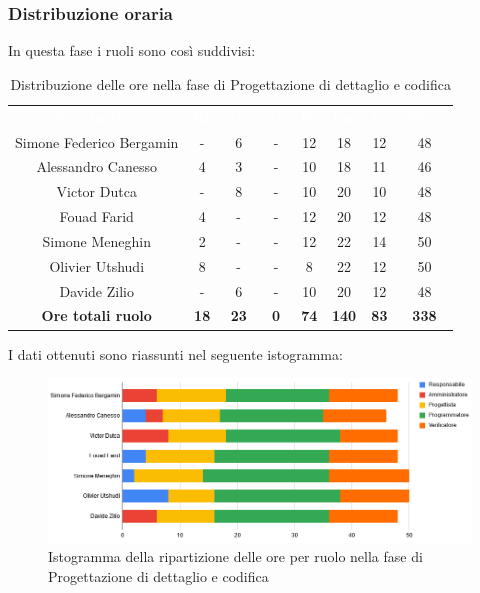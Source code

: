 \subsubsection{Distribuzione oraria}
In questa fase i ruoli sono così suddivisi:
\begin{table}[H]
\centering\renewcommand{\arraystretch}{1.5}
\caption{Distribuzione delle ore nella fase di Progettazione di dettaglio e codifica}
\vspace{0.2cm}
\begin{tabular}{ c c c c c c c c }
\rowcolor{redafk}
\textcolor{white}{\textbf{Nominativo}} & \textcolor{white}{\textbf{Re}} &
\textcolor{white}{\textbf{Am}} & \textcolor{white}{\textbf{An}} &
\textcolor{white}{\textbf{Pt}} & \textcolor{white}{\textbf{Pm}} &
\textcolor{white}{\textbf{Ve}} & \textcolor{white}{\textbf{Totale}} \\
Simone Federico Bergamin & - & 6 & - & 12 & 18 & 12 & 48 \\
Alessandro Canesso & 4 & 3 & - & 10 & 18 & 11 & 46 \\
Victor Dutca & - & 8 & - & 10 & 20 & 10 & 48 \\
Fouad Farid & 4 & - & - & 12 & 20 & 12 & 48 \\
Simone Meneghin & 2 & - & - & 12 & 22 & 14 & 50 \\
Olivier Utshudi & 8 & - & - & 8 & 22 & 12 & 50 \\
Davide Zilio & - & 6 & - & 10 & 20 & 12 & 48 \\
\rowcolor{lastrowcolor}
\textbf{Ore totali ruolo} & \textbf{18} & \textbf{23} & \textbf{0} & \textbf{74} & \textbf{140} & \textbf{83} & \textbf{338} \\
\end{tabular}
\end{table}
 
I dati ottenuti sono riassunti nel seguente istogramma:
\begin{figure}[H]
\centering
\includegraphics[scale=0.60]{img/grafici/tabella_fase_prog_cod.png}
\caption{Istogramma della ripartizione delle ore per ruolo nella fase di Progettazione di dettaglio e codifica}
\end{figure}

